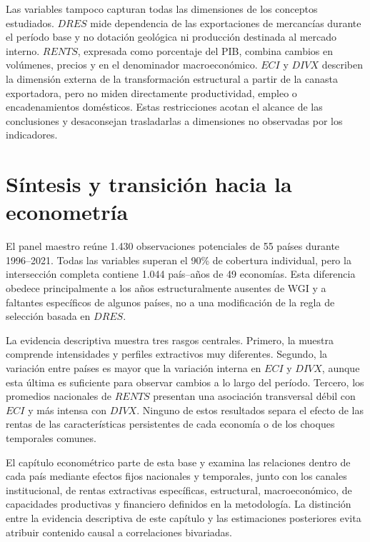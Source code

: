 \documentclass[../../TFM.tex]{subfiles}
\begin{document}
	Las variables tampoco capturan todas las dimensiones de los conceptos
	estudiados. $DRES$ mide dependencia de las exportaciones de mercancías durante
	el período base y no dotación geológica ni producción destinada al mercado
	interno. $RENTS$, expresada como porcentaje del PIB, combina cambios en
	volúmenes, precios y en el denominador macroeconómico. $ECI$ y $DIVX$
	describen la dimensión externa de la transformación estructural a partir de
	la canasta exportadora, pero no miden directamente productividad, empleo o
	encadenamientos domésticos. Estas restricciones acotan el alcance de las
	conclusiones y desaconsejan trasladarlas a dimensiones no observadas por los
	indicadores.

	\section{Síntesis y transición hacia la econometría}
	\label{sec:sintesis-transicion-econometria}

	El panel maestro reúne 1.430 observaciones potenciales de 55 países durante
	1996--2021. Todas las variables superan el 90\% de cobertura individual, pero
	la intersección completa contiene 1.044 país--años de 49 economías. Esta
	diferencia obedece principalmente a los años estructuralmente ausentes de WGI
	y a faltantes específicos de algunos países, no a una modificación de la
	regla de selección basada en $DRES$.

	La evidencia descriptiva muestra tres rasgos centrales. Primero, la muestra
	comprende intensidades y perfiles extractivos muy diferentes. Segundo, la
	variación entre países es mayor que la variación interna en $ECI$ y $DIVX$,
	aunque esta última es suficiente para observar cambios a lo largo del
	período. Tercero, los promedios nacionales de $RENTS$ presentan una asociación
	transversal débil con $ECI$ y más intensa con $DIVX$. Ninguno de estos
	resultados separa el efecto de las rentas de las características persistentes
	de cada economía o de los choques temporales comunes.

	El capítulo econométrico parte de esta base y examina las relaciones dentro
	de cada país mediante efectos fijos nacionales y temporales, junto con los
	canales institucional, de rentas extractivas específicas, estructural,
	macroeconómico, de
	capacidades productivas y financiero definidos en la metodología. La
	distinción entre la evidencia descriptiva de este capítulo y las
	estimaciones posteriores evita atribuir contenido causal a correlaciones
	bivariadas.

\end{document}
